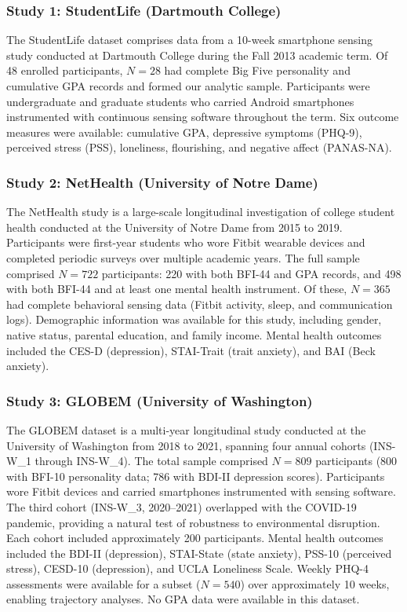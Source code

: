 \documentclass[12pt, a4paper]{article}
\begin{document}
\subsubsection{Study 1: StudentLife (Dartmouth College)}

The StudentLife dataset \citep{wang2014studentlife} comprises data from a 10-week smartphone sensing study conducted at Dartmouth College during the Fall 2013 academic term. Of 48 enrolled participants, $N = 28$ had complete Big Five personality and cumulative GPA records and formed our analytic sample. Participants were undergraduate and graduate students who carried Android smartphones instrumented with continuous sensing software throughout the term. Six outcome measures were available: cumulative GPA, depressive symptoms (PHQ-9), perceived stress (PSS), loneliness, flourishing, and negative affect (PANAS-NA).

\subsubsection{Study 2: NetHealth (University of Notre Dame)}

The NetHealth study is a large-scale longitudinal investigation of college student health conducted at the University of Notre Dame from 2015 to 2019. Participants were first-year students who wore Fitbit wearable devices and completed periodic surveys over multiple academic years. The full sample comprised $N = 722$ participants: 220 with both BFI-44 and GPA records, and 498 with both BFI-44 and at least one mental health instrument. Of these, $N = 365$ had complete behavioral sensing data (Fitbit activity, sleep, and communication logs). Demographic information was available for this study, including gender, native status, parental education, and family income. Mental health outcomes included the CES-D (depression), STAI-Trait (trait anxiety), and BAI (Beck anxiety).

\subsubsection{Study 3: GLOBEM (University of Washington)}

The GLOBEM dataset \citep{xu2022globem} is a multi-year longitudinal study conducted at the University of Washington from 2018 to 2021, spanning four annual cohorts (INS-W\_1 through INS-W\_4). The total sample comprised $N = 809$ participants (800 with BFI-10 personality data; 786 with BDI-II depression scores). Participants wore Fitbit devices and carried smartphones instrumented with sensing software. The third cohort (INS-W\_3, 2020--2021) overlapped with the COVID-19 pandemic, providing a natural test of robustness to environmental disruption. Each cohort included approximately 200 participants. Mental health outcomes included the BDI-II (depression), STAI-State (state anxiety), PSS-10 (perceived stress), CESD-10 (depression), and UCLA Loneliness Scale. Weekly PHQ-4 assessments were available for a subset ($N = 540$) over approximately 10 weeks, enabling trajectory analyses. No GPA data were available in this dataset.
\end{document}
